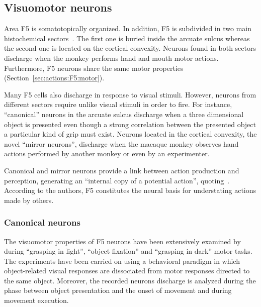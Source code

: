 \subsection{Visuomotor neurons}
\label{sec:actions:F5:visuomotor}
Area F5 is somatotopically organized. In addition, F5 is subdivided in two main
histochemical sectors~\citep{rizzolatti.etal:1988}.
The first one is buried inside the arcuate sulcus whereas the second one is
located on the cortical convexity.
Neurons found in both sectors discharge when the monkey performs hand and mouth
motor actions. 
Furthermore, F5 neurons share the same motor
properties (Section~\ref{sec:actions:F5:motor}).

Many F5 cells also discharge in response to visual stimuli. 
However, neurons from different sectors require unlike visual
stimuli in order to fire. 
For instance, ``canonical'' neurons in the arcuate sulcus discharge when a
three dimensional object is presented even though a strong correlation between
the presented object a particular kind of grip must exist.
Neurons located in the cortical convexity, the novel ``mirror neurons'', 
discharge when the macaque monkey observes hand actions performed by another 
monkey or even by an experimenter.

Canonical and mirror neurons provide a link between action production and 
perception, generating an ``internal copy of a potential
action'', quoting~\citet{rizzolatti.fadiga:1998}.
According to the authors, F5 constitutes the neural basis for understating
actions made by others.
\subsubsection{Canonical neurons}
\label{sec:actions:F5:visuomotor:canonical}
The visuomotor properties of F5 neurons have been extensively examined 
by~\citet{murata.etal:1997} during ``grasping in light'', ``object fixation''
and ``grasping in dark'' motor tasks.
The experiments have been carried on using a behavioral paradigm in which
object-related visual responses are dissociated from motor responses
directed to the same object.
Moreover, the recorded neurons discharge is analyzed during  the phase between
object presentation and the onset of movement and during movement execution.

